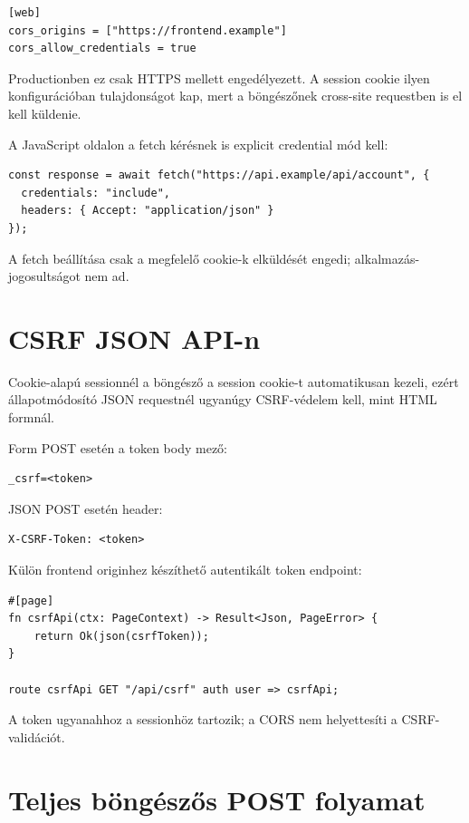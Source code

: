 \begin{lstlisting}
[web]
cors_origins = ["https://frontend.example"]
cors_allow_credentials = true
\end{lstlisting}

Productionben ez csak HTTPS mellett engedélyezett. A session cookie ilyen konfigurációban  tulajdonságot kap, mert a böngészőnek cross-site requestben is el kell küldenie.

A JavaScript oldalon a fetch kérésnek is explicit credential mód kell:

\begin{lstlisting}
const response = await fetch("https://api.example/api/account", {
  credentials: "include",
  headers: { Accept: "application/json" }
});
\end{lstlisting}

A fetch  beállítása csak a megfelelő cookie-k elküldését engedi; alkalmazás-jogosultságot nem ad.

\section{CSRF JSON API-n}

Cookie-alapú sessionnél a böngésző a session cookie-t automatikusan kezeli, ezért állapotmódosító JSON requestnél ugyanúgy CSRF-védelem kell, mint HTML formnál.

Form POST esetén a token body mező:

\begin{lstlisting}
_csrf=<token>
\end{lstlisting}

JSON POST esetén header:

\begin{lstlisting}
X-CSRF-Token: <token>
\end{lstlisting}

Külön frontend originhez készíthető autentikált token endpoint:

\begin{lstlisting}[language=Velran]
#[page]
fn csrfApi(ctx: PageContext) -> Result<Json, PageError> {
    return Ok(json(csrfToken));
}

route csrfApi GET "/api/csrf" auth user => csrfApi;
\end{lstlisting}

A token ugyanahhoz a sessionhöz tartozik; a CORS nem helyettesíti a CSRF-validációt.

\section{Teljes böngészős POST folyamat}

